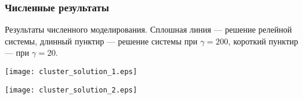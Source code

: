 \begin{frame}
	\frametitle{Численные результаты}
	
	Результаты численного моделирования. Сплошная линия --- решение релейной системы, длинный пунктир --- решение системы при $\gamma = 200$, короткий пунктир --- при $\gamma = 20$.
	
	\begin{center}
	\texttt{[image: cluster\_solution\_1.eps]}
	
	\smallskip
	
	\texttt{[image: cluster\_solution\_2.eps]}
	\end{center}
\end{frame}
